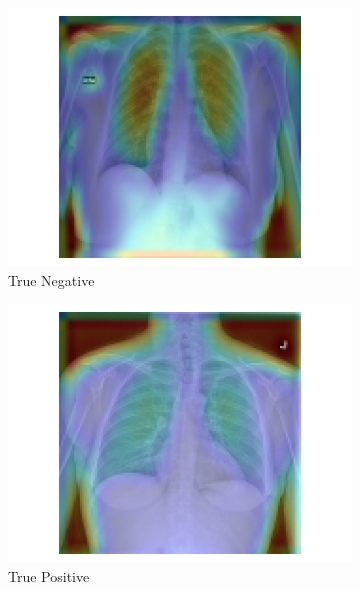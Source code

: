 \documentclass[conference]{IEEEtran}
\begin{document}
\begin{figure}[htbp]
    \centering
	\begin{subfigure}[b]{0.22\linewidth}
        \includegraphics[width=\linewidth]{Images/gradcam_true_neg.png}
        \caption{True Negative}
		\label{fig:true_neg}
    \end{subfigure}
    \hfill
	\begin{subfigure}[b]{0.22\linewidth}
        \includegraphics[width=\linewidth]{Images/gradcam_true_pos.png}
        \caption{True Positive}
		\label{fig:true_pos}
    \end{subfigure}
	\hfill
    \begin{subfigure}[b]{0.22\linewidth}

\end{subfigure}
\end{figure}
\end{document}
